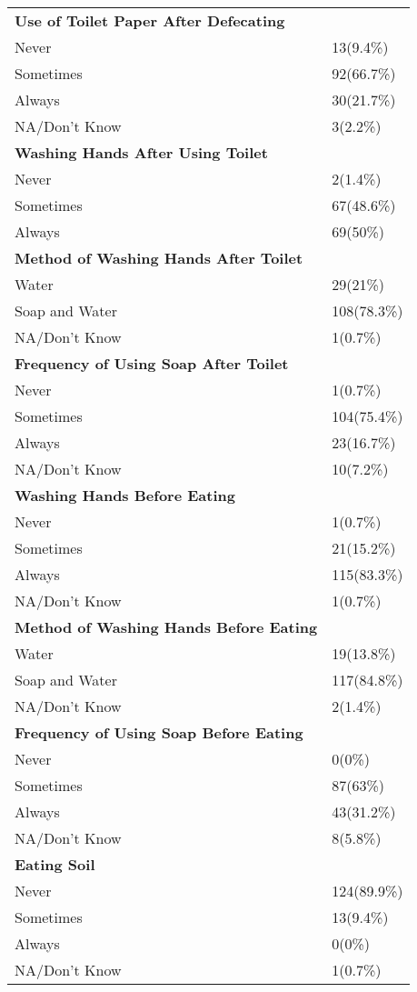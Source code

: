 \documentclass[10pt,letterpaper]{article}
\begin{document}
\begin{longtable}{ll}
\midrule
\textbf{Use of Toilet Paper After Defecating} & \\
Never & 13(9.4\%) \\
Sometimes & 92(66.7\%) \\
Always & 30(21.7\%) \\
NA/Don't Know & 3(2.2\%) \\
\midrule
\textbf{Washing Hands After Using Toilet} & \\
Never & 2(1.4\%) \\
Sometimes & 67(48.6\%) \\
Always & 69(50\%) \\
\midrule
\textbf{Method of Washing Hands After Toilet} & \\
Water & 29(21\%) \\
Soap and Water & 108(78.3\%) \\
NA/Don't Know & 1(0.7\%) \\
\midrule
\textbf{Frequency of Using Soap After Toilet} & \\
Never & 1(0.7\%) \\
Sometimes & 104(75.4\%) \\
Always & 23(16.7\%) \\
NA/Don't Know & 10(7.2\%) \\
\midrule
\textbf{Washing Hands Before Eating} & \\
Never & 1(0.7\%) \\
Sometimes & 21(15.2\%) \\
Always & 115(83.3\%) \\
NA/Don't Know & 1(0.7\%) \\
\midrule
\textbf{Method of Washing Hands Before Eating} & \\
Water & 19(13.8\%) \\
Soap and Water & 117(84.8\%) \\
NA/Don't Know & 2(1.4\%) \\
\midrule
\textbf{Frequency of Using Soap Before Eating} & \\
Never & 0(0\%) \\
Sometimes & 87(63\%) \\
Always & 43(31.2\%) \\
NA/Don't Know & 8(5.8\%) \\
\midrule
\textbf{Eating Soil} & \\
Never & 124(89.9\%) \\
Sometimes & 13(9.4\%) \\
Always & 0(0\%) \\
NA/Don't Know & 1(0.7\%) \\

\end{longtable}
\end{document}
